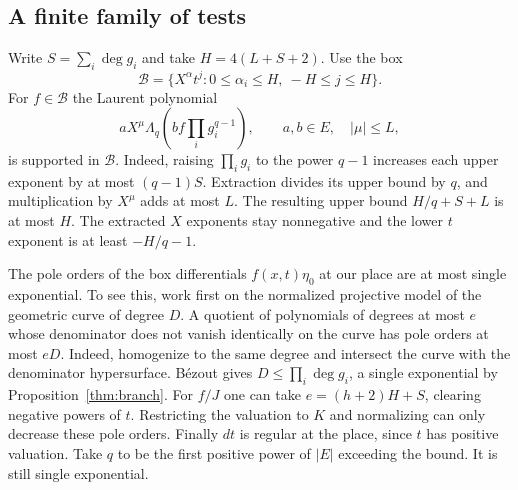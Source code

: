 \documentclass[11pt,letterpaper]{article}
\theoremstyle{definition}
\numberwithin{equation}{section}
\begin{document}
\subsection{A finite family of tests}

Write $S=\sum_i \deg g_i$ and take $H=4(L+S+2)$. Use the box
\[
  \mathcal{B}=\{X^\alpha t^j: 0\le\alpha_i\le H,\ -H\le j\le H\}.
\]
For $f\in \mathcal{B}$ the Laurent polynomial
\begin{equation}\label{eq:test}
  aX^\mu\Lambda_q\left(bf\prod_i g_i^{q-1}\right),\qquad a,b\in E,\quad|\mu|\le L,
\end{equation}
is supported in $\mathcal{B}$. Indeed, raising $\prod_i g_i$ to the power $q-1$ increases each upper exponent
by at most $(q-1)S$. Extraction divides its upper bound by $q$, and multiplication by $X^\mu$
adds at most $L$. The resulting upper bound $H/q+S+L$ is at most $H$. The extracted $X$
exponents stay nonnegative and the lower $t$ exponent is at least $-H/q-1$.

The pole orders of the box differentials $f(x,t)\eta_0$ at our place are at most single exponential.
To see this, work first on the normalized projective model of the geometric curve of degree
$D$. A quotient of polynomials of degrees at most $e$ whose denominator does not vanish
identically on the curve has pole orders at most $eD$. Indeed, homogenize to the same degree
and intersect the curve with the denominator hypersurface. Bézout gives $D\le \prod_i \deg g_i$, a
single exponential by Proposition~\ref{thm:branch}. For $f/J$ one can take $e=(h+2)H+S$, clearing
negative powers of $t$. Restricting the valuation to $K$ and normalizing can only decrease these
pole orders. Finally $dt$ is regular at the place, since $t$ has positive valuation. Take $q$ to be
the first positive power of $|E|$ exceeding the bound. It is still single exponential.
\end{document}

